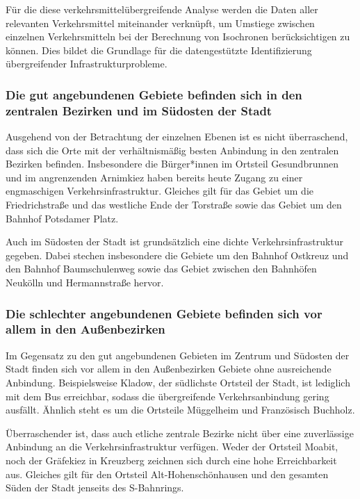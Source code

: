Für die diese verkehrsmittelübergreifende Analyse werden die Daten aller relevanten Verkehrsmittel miteinander verknüpft, um Umstiege zwischen einzelnen Verkehrsmitteln bei der Berechnung von Isochronen berücksichtigen zu können. Dies bildet die Grundlage für die datengestützte Identifizierung übergreifender Infrastrukturprobleme.







\subsubsection{Die gut angebundenen Gebiete befinden sich in den zentralen Bezirken und im Südosten der Stadt}
Ausgehend von der Betrachtung der einzelnen Ebenen ist es nicht überraschend, dass sich die Orte mit der verhältnismäßig besten Anbindung in den zentralen Bezirken befinden. Insbesondere die Bürger*innen im Ortsteil Gesundbrunnen und im angrenzenden Arnimkiez haben bereits heute Zugang zu einer engmaschigen Verkehrsinfrastruktur. Gleiches gilt für das Gebiet um die Friedrichstraße und das westliche Ende der Torstraße sowie das Gebiet um den Bahnhof Potsdamer Platz.

Auch im Südosten der Stadt ist grundsätzlich eine dichte Verkehrsinfrastruktur gegeben. Dabei stechen insbesondere die Gebiete um den Bahnhof Ostkreuz und den Bahnhof Baumschulenweg sowie das Gebiet zwischen den Bahnhöfen Neukölln und Hermannstraße hervor.








\subsubsection{Die schlechter angebundenen Gebiete befinden sich vor allem in den Außenbezirken}
Im Gegensatz zu den gut angebundenen Gebieten im Zentrum und Südosten der Stadt finden sich vor allem in den Außenbezirken Gebiete ohne ausreichende Anbindung. Beispielsweise Kladow, der südlichste Ortsteil der Stadt, ist lediglich mit dem Bus erreichbar, sodass die übergreifende Verkehrsanbindung gering ausfällt. Ähnlich steht es um die Ortsteile Müggelheim und Französisch Buchholz.

Überraschender ist, dass auch etliche zentrale Bezirke nicht über eine zuverlässige Anbindung an die Verkehrsinfrastruktur verfügen. Weder der Ortsteil Moabit, noch der Gräfekiez in Kreuzberg zeichnen sich durch eine hohe Erreichbarkeit aus. Gleiches gilt für den Ortsteil Alt-Hohenschönhausen und den gesamten Süden der Stadt jenseits des S-Bahnrings.






